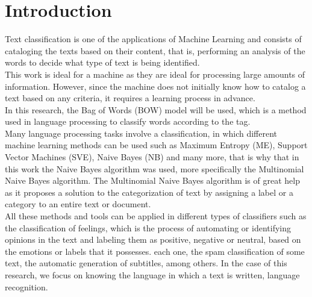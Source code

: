 \documentclass[sigconf,12pt,review=false,natbib=false]{acmart}
\begin{document}
\maketitle

\section{Introduction}

Text classification is one of the applications of Machine Learning and consists of cataloging the
texts based on their content, that is, performing an analysis of the words to decide what type of
text is being identified. \\

This work is ideal for a machine as they are ideal for processing large amounts of information.
However, since the machine does not initially know how to catalog a text based on any criteria, it
requires a learning process in advance. \\

In this research, the Bag of Words (BOW) model will be used, which is a method used in language
processing to classify words according to the tag. \\

Many language processing tasks involve a classification, in which different machine learning methods
can be used such as Maximum Entropy (ME), Support Vector Machines (SVE), Naive Bayes (NB) and many
more, that is why that in this work the Naive Bayes algorithm was used, more specifically the
Multinomial Naive Bayes algorithm. The Multinomial Naive Bayes algorithm is of great help as it
proposes a solution to the categorization of text by assigning a label or a category to an entire
text or document. \\

All these methods and tools can be applied in different types of classifiers such as the
classification of feelings, which is the process of automating or identifying opinions in the text
and labeling them as positive, negative or neutral, based on the emotions or labels that it possesses.
each one, the spam classification of some text, the automatic generation of subtitles, among others.
In the case of this research, we focus on knowing the language in which a text is written, language
recognition. \\
\end{document}
